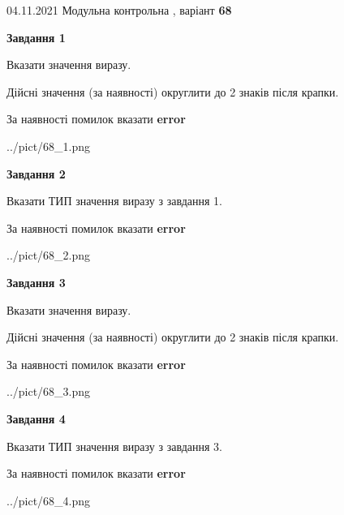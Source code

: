 \documentclass[11pt, ukrainian]{article}
\begin{document}
{04.11.2021 Модульна контрольна , варіант  \No \textbf { 68 }\par}
{
\begin {large}
{\begin {center}\textbf{Завдання 1}\end {center}}\par
Вказати значення виразу. \par
Дійсні значення (за наявності) округлити до 2 знаків після крапки. \par
За наявності помилок вказати \textbf{error}

\begin{center}
	{../pict/68_1.png}
\end{center}
\newpage

{\begin {center}\textbf{Завдання 2}\end {center}}\par
Вказати ТИП значення виразу з завдання 1. \par
За наявності помилок вказати \textbf{error}

\begin{center}
	{../pict/68_2.png}
\end{center}
\newpage

{\begin {center}\textbf{Завдання 3}\end {center}}\par
Вказати значення виразу. \par
Дійсні значення (за наявності) округлити до 2 знаків після крапки. \par
За наявності помилок вказати \textbf{error}

\begin{center}
	{../pict/68_3.png}
\end{center}
\newpage

{\begin {center}\textbf{Завдання 4}\end {center}}\par
Вказати ТИП значення виразу з завдання 3. \par
За наявності помилок вказати \textbf{error}

\begin{center}
	{../pict/68_4.png}
\end{center}
\newpage


\end{large}}
\end{document}
